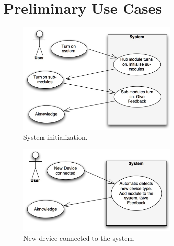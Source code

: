 \section{Preliminary Use Cases}

\begin{figure}[!h]
	\begin{centering}
		\includegraphics[width=0.7\textwidth]{images/usecases1.jpg}
		\caption{System initialization. }
	\end{centering}
\end{figure}

\begin{figure}[!h]
	\begin{centering}
		\includegraphics[width=0.7\textwidth]{images/usecases2.jpg}
		\caption{New device connected to the system. }
	\end{centering}
\end{figure}
\newpage

